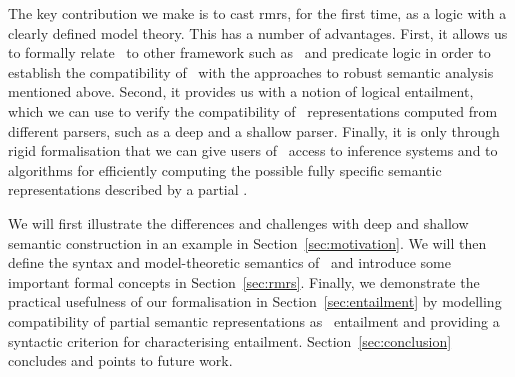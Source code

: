 The key contribution we make is to cast {\sc rmrs}, for the first
time, as a logic with a clearly defined model theory.  This has a
number of advantages.  First, it allows us to formally relate \rmrs\ to
other framework such as \mrs\ and predicate logic in order to
establish the compatibility of \rmrs\ with the approaches to robust
semantic analysis mentioned above.  Second, it provides us with a
notion of logical entailment, which we can use to verify the
compatibility of \rmrs\ representations computed from different
parsers, such as a deep and a shallow parser.  Finally, it is only
through rigid formalisation that we can give users of \rmrs\ access to
inference systems and to algorithms for efficiently computing the
possible fully specific semantic representations described by a
partial \rmrs.

We will first illustrate the differences and challenges with deep and
shallow semantic construction in an example in
Section~\ref{sec:motivation}.  We will then define the syntax and
model-theoretic semantics of \rmrs\ and introduce some important
formal concepts in Section~\ref{sec:rmrs}.  Finally, we demonstrate
the practical usefulness of our formalisation in
Section~\ref{sec:entailment} by modelling compatibility of
partial semantic representations as \rmrs\ entailment and providing a
syntactic criterion for characterising entailment.
Section~\ref{sec:conclusion} concludes and points to future work.


